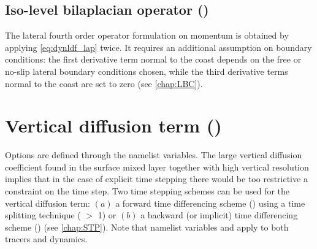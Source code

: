 \documentclass[../main/NEMO_manual]{subfiles}
\begin{document}
\subsection[Iso-level bilaplacian (\protect\np{ln\_dynldf\_bilap}\forcode{ = .true.})]
				{Iso-level bilaplacian operator (\protect{})}
\label{subsec:DYN_ldf_bilap}

The lateral fourth order operator formulation on momentum is obtained by applying \autoref{eq:dynldf_lap} twice.
It requires an additional assumption on boundary conditions:
the first derivative term normal to the coast depends on the free or no-slip lateral boundary conditions chosen,
while the third derivative terms normal to the coast are set to zero (see \autoref{chap:LBC}).

\section{Vertical diffusion term (\protect{})}
\label{sec:DYN_zdf}


Options are defined through the  namelist variables.
The large vertical diffusion coefficient found in the surface mixed layer together with high vertical resolution implies that in the case of explicit time stepping there would be too restrictive a constraint on the time step.
Two time stepping schemes can be used for the vertical diffusion term:
$(a)$ a forward time differencing scheme
() using a time splitting technique ( $>$ 1) or
$(b)$ a backward (or implicit) time differencing scheme ()
(see \autoref{chap:STP}).
Note that namelist variables  and  apply to both tracers and dynamics. 
\end{document}
